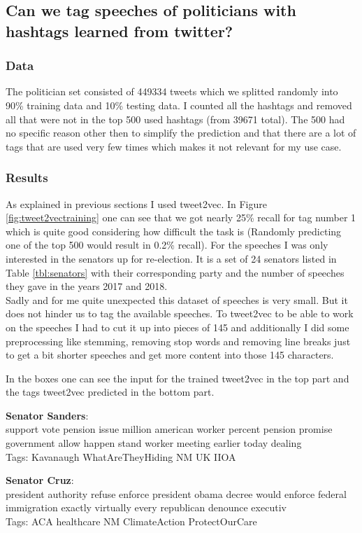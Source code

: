 \documentclass[10pt,conference,compsocconf]{IEEEtran}
\begin{document}
\subsection{Can we tag speeches of politicians with hashtags learned from twitter? }
\subsubsection{Data}
The politician set consisted of 449334 tweets which we splitted randomly into 90\% training data and 10\% testing data. I counted all the hashtags and removed all that were not in the top 500 used hashtags (from 39671 total). The 500 had no specific reason other then to simplify the prediction and that there are a lot of tags that are used very few times which makes it not relevant for my use case. 

\subsubsection{Results}

As explained in previous sections I used tweet2vec.  In Figure \ref{fig:tweet2vectraining} one can see that we got nearly 25\% recall for tag number 1 which is quite good considering how difficult the task is (Randomly predicting one of the top 500 would result in 0.2\% recall). For the speeches I was only interested in the senators up for re-election. It is a set of 24 senators listed in Table \ref{tbl:senators} with their corresponding party and the number of speeches they gave in the years 2017 and 2018. \\
Sadly and for me quite unexpected this dataset of speeches is very small.  But it does not hinder us to tag the available speeches. To tweet2vec to be able to work on the speeches I had to cut it up into pieces of 145 and additionally I did some preprocessing like stemming, removing stop words and removing line breaks just to get a bit shorter speeches and get more content into those 145 characters. 

In the boxes one can see the input for the trained tweet2vec in the top part and the tags tweet2vec predicted in the bottom part. 

\begin{framed}
	\textbf{Senator Sanders}: \\
	support vote pension issue million american worker percent pension promise government allow happen stand worker meeting earlier today dealing \\
	Tags: Kavanaugh WhatAreTheyHiding NM UK IIOA
\end{framed}
\begin{framed}
	\textbf{Senator Cruz}: \\
 president authority refuse enforce president obama decree would enforce federal immigration exactly virtually every republican denounce executiv
 \\
	Tags: ACA healthcare NM ClimateAction ProtectOurCare
\end{framed}
\end{document}
